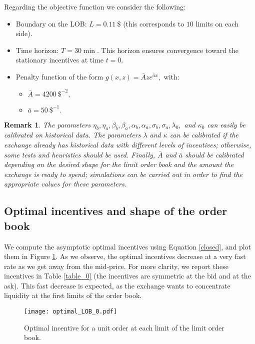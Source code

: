 \documentclass[11pt]{article}
\newtheorem{rem}{Remark}
\begin{document}
Regarding the objective function we consider the following:
\begin{itemize}
    \item Boundary on the LOB: $L=0.11 \ \$$ (this corresponds to $10$ limits on each side).
    \item Time horizon: $T=30 \min$. This horizon ensures convergence toward the stationary incentives at time $t=0$.
    \item Penalty function of the form $g(x,z) = \bar A ze^{\bar a x},$ with:
        \begin{itemize}
        \item[] $\bar A = 4200\ \$^{-2},$
        \item[] $\bar a = 50\ \$^{-1}.$
    \end{itemize}
\end{itemize}

\begin{rem}
The parameters $\eta_b, \eta_a, \beta_b, \beta_a, \alpha_b, \alpha_a, \sigma_b, \sigma_a, \lambda_0,$ and $\kappa_0$ can easily be calibrated on historical data. The parameters $\lambda$ and $\kappa$ can be calibrated if the exchange already has historical data with different levels of incentives; otherwise, some tests and heuristics should be used. Finally, $\bar A$ and $\bar a$ should be calibrated depending on the desired shape for the limit order book and the amount the exchange is ready to spend; simulations can be carried out in order to find the appropriate values for these parameters. 
\end{rem}

\subsection{Optimal incentives and shape of the order book}

We compute the asymptotic optimal incentives using Equation \eqref{closed}, and plot them in Figure \ref{opt_0}. As we observe, the optimal incentives decrease at a very fast rate as we get away from the mid-price. For more clarity, we report these incentives in Table \ref{table_0} (the incentives are symmetric at the bid and at the ask). This fast decrease is expected, as the exchange wants to concentrate liquidity at the first limits of the order book.\\

\begin{figure}[!h]\centering
\texttt{[image: optimal\_LOB\_0.pdf]}\\
\caption{Optimal incentive for a unit order at each limit of the limit order book.}\label{opt_0}
\end{figure}
\end{document}
